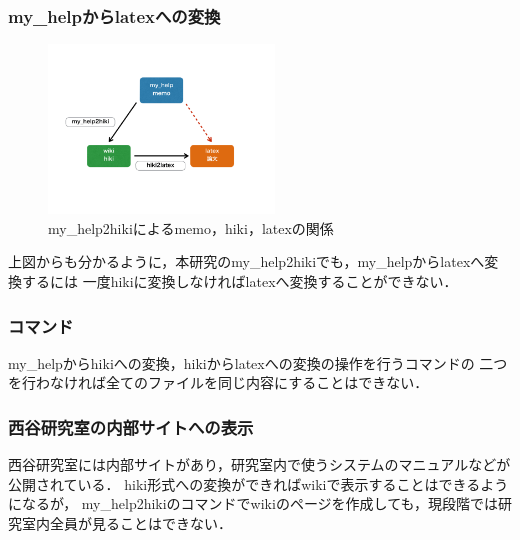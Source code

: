 \subsubsection{my\_helpからlatexへの変換}
\begin{figure}[htbp]\begin{center}
\includegraphics[width=6cm,bb=0 0 442 500]{../figs/./my_help2hiki_saki.007.png}
\caption{my\_help2hikiによるmemo，hiki，latexの関係}
\label{default}\end{center}\end{figure}
上図からも分かるように，本研究のmy\_help2hikiでも，my\_helpからlatexへ変換するには
一度hikiに変換しなければlatexへ変換することができない．

\subsubsection{コマンド}
my\_helpからhikiへの変換，hikiからlatexへの変換の操作を行うコマンドの
二つを行わなければ全てのファイルを同じ内容にすることはできない．

\subsubsection{西谷研究室の内部サイトへの表示}
西谷研究室には内部サイトがあり，研究室内で使うシステムのマニュアルなどが公開されている．
hiki形式への変換ができればwikiで表示することはできるようになるが，
my\_help2hikiのコマンドでwikiのページを作成しても，現段階では研究室内全員が見ることはできない．

